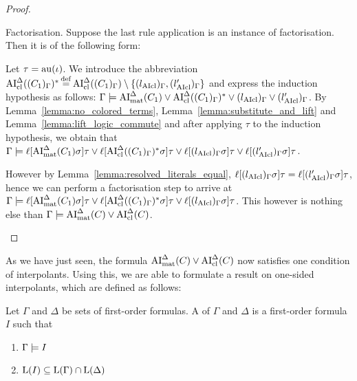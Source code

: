 \documentclass[,%
	draft=false,%
	numbers=noendperiod
	11pt,
	a4paper,
	oneside,%
	openany,
]{memoir}
\begin{document}
\begin{proof}
\begin{description}
\begin{enumerate}
			\end{enumerate}



		\item{Factorisation.}
			Suppose the last rule application is an instance of factorisation. Then it is of the following form:
			\begin{prooftree}
			\end{prooftree}

			Let $\tau = \operatorname{au}(\iota)$.
			We introduce the abbreviation $\operatorname{AI}_\mathrm{cl}^\Delta( (C_1)_\Gamma)^* \operatorname{\stackrel{\mathrm{def}}{=}}\allowbreak \operatorname{AI}_\mathrm{cl}^\Delta( (C_1)_\Gamma) \setminus \{ (l_{\operatorname{AIcl}})_\Gamma , (l'_{\operatorname{AIcl}})_\Gamma \}$ and express the induction hypothesis as follows:
			$\Gamma \models \operatorname{AI}_\mathrm{mat}^\Delta(C_1) \lor \operatorname{AI}_\mathrm{cl}^\Delta( (C_1)_\Gamma)^* \lor (l_{\operatorname{AIcl}})_\Gamma \lor (l'_{\operatorname{AIcl}})_\Gamma $.
			By Lemma~\ref{lemma:no_colored_terms}, Lemma~\ref{lemma:substitute_and_lift} and Lemma~\ref{lemma:lift_logic_commute} and after applying $\tau$ to the induction hypothesis, we obtain that
			$\Gamma \models \ell[\operatorname{AI}_\mathrm{mat}^\Delta(C_1)\sigma]\tau \lor \ell[\operatorname{AI}_\mathrm{cl}^\Delta( (C_1)_\Gamma)^*\sigma]\tau \lor \ell[(l_{\operatorname{AIcl}})_\Gamma \sigma]\tau \lor \ell[(l'_{\operatorname{AIcl}})_\Gamma\sigma]\tau $.

			However by Lemma~\ref{lemma:resolved_literals_equal},
			$\ell[(l_{\operatorname{AIcl}})_\Gamma\sigma]\tau =
			\ell[(l'_{\operatorname{AIcl}})_\Gamma\sigma]\tau$, hence we can perform a factorisation step to arrive at
			$\Gamma \models \ell[\operatorname{AI}_\mathrm{mat}^\Delta(C_1)\sigma]\tau \lor \ell[\operatorname{AI}_\mathrm{cl}^\Delta( (C_1)_\Gamma)^*\sigma]\tau \lor \ell[(l_{\operatorname{AIcl}})_\Gamma \sigma]\tau$.
			This however is nothing else than $\Gamma\models \operatorname{AI}_\mathrm{mat}^\Delta(C) \lor \operatorname{AI}_\mathrm{cl}^\Delta(C)$.
			\qedhere
	\end{description}
\end{proof}


As we have just seen, the formula $\operatorname{AI}_\mathrm{mat}^\Delta(C) \lor \operatorname{AI}_\mathrm{cl}^\Delta(C)$ now satisfies one condition of interpolants.
Using this, we are able to formulate a result on one-sided interpolants, which are defined as follows:

\begin{defi}
	Let $\Gamma$ and $\Delta$ be sets of first-order formulas.
	A  of $\Gamma$ and $\Delta$ is a first-order formula $I$ such that
	\begin{enumerate}
		\item $\Gamma \models I$
		\item $\operatorname{L}(I) \subseteq \operatorname{L}(\Gamma) \cap \operatorname{L}(\Delta)$
			\qedhere
	\end{enumerate}
\end{defi}
\end{document}
